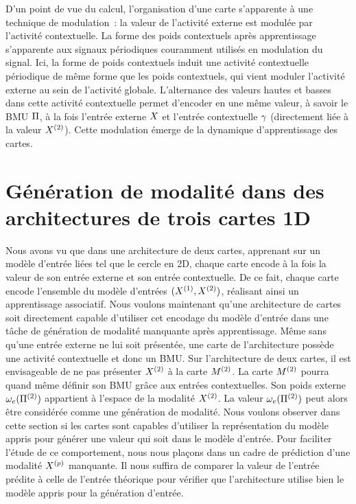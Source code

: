 \documentclass[../main]{subfiles}
\begin{document}
D'un point de vue du calcul, l'organisation d'une carte s'apparente à une technique de modulation~: la valeur de l'activité externe est modulée par l'activité contextuelle. 
La forme des poids contextuels après apprentissage s'apparente aux signaux périodiques couramment utilisés en modulation du signal. 
Ici, la forme de poids contextuels induit une activité contextuelle \og périodique \fg{} de même forme que les poids contextuels, qui vient moduler l'activité externe au sein de l'activité globale. 
L'alternance des valeurs hautes et basses dans cette activité contextuelle permet d'encoder en une même valeur, à savoir le BMU $\Pi$, à la fois l'entrée externe $X$ et l'entrée contextuelle $\gamma$ (directement liée à la valeur $X^{({2})}$). 
Cette modulation émerge de la dynamique d'apprentissage des cartes.


\section{Génération de modalité dans des architectures de trois cartes 1D}\label{sec:pred}

Nous avons vu que dans une architecture de deux cartes, apprenant sur un modèle d'entrée liées tel que le cercle en 2D, chaque carte encode à la fois la valeur de son entrée externe et son entrée contextuelle. De ce fait, chaque carte encode l'ensemble du modèle d'entrées $(X^{({1})}, X^{({2})})$, réalisant ainsi un apprentissage associatif. 
Nous voulons maintenant qu'une architecture de cartes soit directement capable d'utiliser cet encodage du modèle d'entrée dans une tâche de génération de modalité manquante après apprentissage.
Même sans qu'une entrée externe ne lui soit présentée, une carte de l'architecture possède une activité contextuelle et donc un BMU. 
Sur l'architecture de deux cartes, il est envisageable de ne pas présenter $X^{({2})}$ à la carte $M^{({2})}$. La carte $M^{({2})}$ pourra quand même définir son BMU grâce aux entrées contextuelles. Son poids externe $\omega_e(\Pi^{({2})})$ appartient à l'espace de la modalité $X^{({2})}$. 
La valeur $\omega_e(\Pi^{({2})})$ peut alors être considérée comme une génération de modalité. 
Nous voulons observer dans cette section si les cartes sont capables d'utiliser la représentation du modèle appris pour générer une valeur qui soit dans le modèle d'entrée.
Pour faciliter l'étude de ce comportement, nous nous plaçons dans un cadre de prédiction d'une modalité $X^{({p})}$ manquante. 
Il nous suffira de comparer la valeur de l'entrée prédite à celle de l'entrée théorique pour vérifier que l'architecture utilise bien le modèle appris pour la génération d'entrée.
\end{document}
